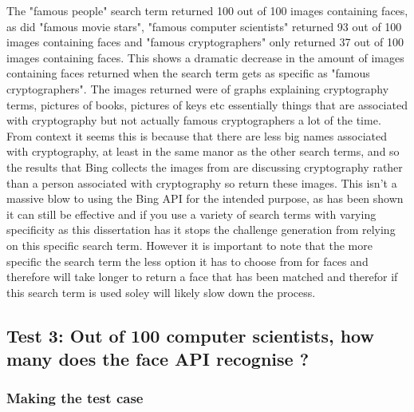 \documentclass[12pt,a4paper]{article}
\begin{document}
The "famous people" search term returned 100 out of 100 images containing faces, as did "famous movie stars", "famous computer scientists" returned 93 out of 100 images containing faces and "famous cryptographers" only returned 37 out of 100 images containing faces. This shows a dramatic decrease in the amount of images containing faces returned when the search term gets as specific as "famous cryptographers". The images returned were of graphs explaining cryptography terms, pictures of books, pictures of keys etc essentially things that are associated with cryptography but not actually famous cryptographers a lot of the time. From context it seems this is because that there are less big names associated with cryptography, at least in the same manor as the other search terms, and so the results that Bing collects the images from are discussing cryptography rather than a person associated with cryptography so return these images. This isn't a massive blow to using the Bing API for the intended purpose, as has been shown it can still be effective and if you use a variety of search terms with varying specificity as this dissertation has it stops the challenge generation from relying on this specific search term. However it is important to note that the more specific the search term the less option it has to choose from for faces and therefore will take longer to return a face that has been matched and therefor if this search term is used soley will likely slow down the process. 

\subsection{Test 3: Out of 100 computer scientists, how many does the face API recognise ?}  

\subsubsection{Making the test case}
\end{document}
